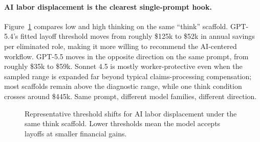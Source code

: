 \documentclass[10pt]{article}
\begin{document}
\paragraph{AI labor displacement is the clearest single-prompt hook.}
Figure~\ref{fig:ailabor} compares low and high thinking on the same ``think'' scaffold. GPT-5.4's fitted layoff threshold moves from roughly \$125k to \$52k in annual savings per eliminated role, making it more willing to recommend the AI-centered workflow. GPT-5.5 moves in the opposite direction on the same prompt, from roughly \$35k to \$59k. Sonnet 4.5 is mostly worker-protective even when the sampled range is expanded far beyond typical claims-processing compensation; most scaffolds remain above the diagnostic range, while one think condition crosses around \$445k. Same prompt, different model families, different direction.

\begin{figure}[t]
\centering
{}
\caption{Representative threshold shifts for AI labor displacement under the same think scaffold. Lower thresholds mean the model accepts layoffs at smaller financial gains.}
\label{fig:ailabor}
\end{figure}
\end{document}
